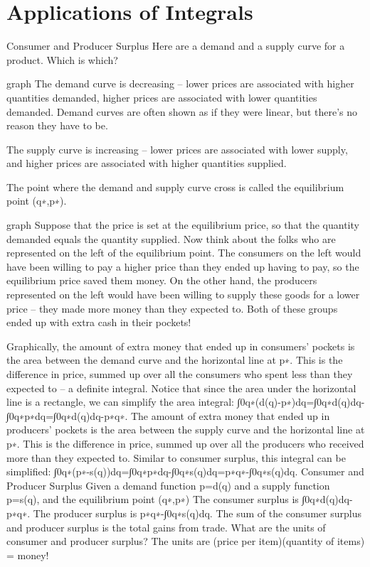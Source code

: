 \section{Applications of Integrals}
\label{sec:integral-applications}


Consumer and Producer Surplus
Here are a demand and a supply curve for a product. Which is which?

graph
The demand curve is decreasing – lower prices are associated with higher quantities demanded, higher prices are associated with lower quantities demanded. Demand curves are often shown as if they were linear, but there’s no reason they have to be.

The supply curve is increasing – lower prices are associated with lower supply, and higher prices are associated with higher quantities supplied.

The point where the demand and supply curve cross is called the equilibrium point (q∗,p∗).

graph
Suppose that the price is set at the equilibrium price, so that the quantity demanded equals the quantity supplied. Now think about the folks who are represented on the left of the equilibrium point. The consumers on the left would have been willing to pay a higher price than they ended up having to pay, so the equilibrium price saved them money. On the other hand, the producers represented on the left would have been willing to supply these goods for a lower price – they made more money than they expected to. Both of these groups ended up with extra cash in their pockets!

Graphically, the amount of extra money that ended up in consumers' pockets is the area between the demand curve and the horizontal line at p∗. This is the difference in price, summed up over all the consumers who spent less than they expected to – a definite integral. Notice that since the area under the horizontal line is a rectangle, we can simplify the area integral:
∫0q∗(d(q)-p∗)dq=∫0q∗d(q)dq-∫0q∗p∗dq=∫0q∗d(q)dq-p∗q∗.
The amount of extra money that ended up in producers' pockets is the area between the supply curve and the horizontal line at p∗. This is the difference in price, summed up over all the producers who received more than they expected to. Similar to consumer surplus, this integral can be simplified:
∫0q∗(p∗-s(q))dq=∫0q∗p∗dq-∫0q∗s(q)dq=p∗q∗-∫0q∗s(q)dq.
Consumer and Producer Surplus
Given a demand function p=d(q) and a supply function p=s(q), and the equilibrium point (q∗,p∗)
The consumer surplus is
∫0q∗d(q)dq-p∗q∗.
The producer surplus is
p∗q∗-∫0q∗s(q)dq.
The sum of the consumer surplus and producer surplus is the total gains from trade.
What are the units of consumer and producer surplus? The units are (price per item)(quantity of items) = money!

